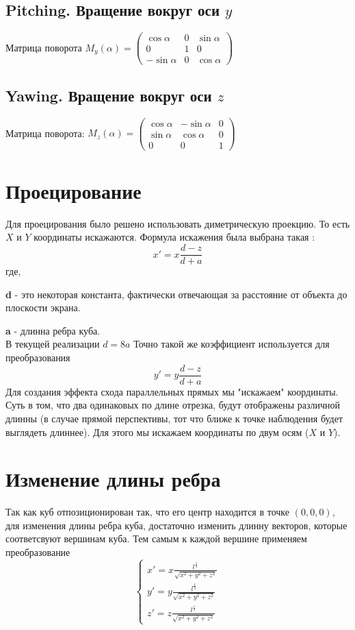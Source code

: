 \documentclass[a4paper,11pt]{article}
\begin{document}
  \subsection*{Pitching. Вращение вокруг оси $y$}
Матрица поворота  $M_y(\alpha) = 
\begin{pmatrix} 
\cos \alpha   & 0 & \sin \alpha \\
   0          & 1 &  0          \\
 -\sin \alpha & 0 & \cos \alpha
\end{pmatrix} $
  \subsection*{Yawing. Вращение вокруг оси $z$}
Матрица поворота:  $M_z(\alpha) =
\begin{pmatrix} 
\cos  \alpha  &  -\sin \alpha & 0 \\
\sin \alpha & \cos \alpha & 0 \\
   0          & 0           & 1
\end{pmatrix} $
  \section{Проецирование}
 Для проецирования было решено использовать диметрическую проекцию. То есть $X$ и $Y$ координаты искажаются. Формула искажения была выбрана такая : 
\[  x' = x\frac{d-z}{d+a} \]
где, 


 
\textbf{d} - это некоторая константа, фактически отвечающая за расстояние от объекта до плоскости экрана. 



\textbf{a} - длинна ребра куба. 
\\
В текущей реализации $d = 8a$
Точно такой же коэффициент используется для преобразования 
\[  y' = y\frac{d-z}{d+a} \]
Для создания эффекта схода параллельных прямых мы "искажаем" координаты. Суть в том, что два одинаковых по длине отрезка, будут отображены различной длинны (в случае прямой перспективы, тот что ближе к точке наблюдения будет выглядеть длиннее). Для этого мы искажаем координаты по двум осям ($X$ и $Y$).   
  \section{Изменение длины ребра}
  Так как куб отпозиционирован так, что его центр находится в точке $(0,0,0)$, 
  для изменения длины ребра куба, достаточно изменить длинну векторов, которые соответсвуют вершинам куба. Тем самым к каждой вершине применяем преобразование
  \linebreak
\[ 
\begin{cases}
   x' = x\frac{l^{\frac{1}{3}}}{\sqrt{x^2+y^2+z^2}} \\
   y' = y\frac{l^{\frac{1}{3}}}{\sqrt{x^2+y^2+z^2}} \\
   z' = z\frac{l^{\frac{1}{3}}}{\sqrt{x^2+y^2+z^2}}
\end{cases}
 \] 
\end{document}
